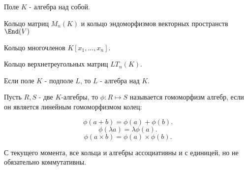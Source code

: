 \begin{example} \thmslashn

    Поле $K$ - алгебра над собой.

    Кольцо матриц $M_{n}(K)$ и кольцо эндоморфизмов векторных пространств $\End(V)$

    Кольцо многочленов $K[x_1, \ldots, x_{n}]$.

    Кольцо верхнетреугольных матриц $LT_{n}(K)$.

    Если поле $K$ - подполе $L$, то $L$ - алгебра над $K$.
\end{example}
\begin{definition} \thmslashn 

    Пусть $R, S$ - две $K$-алгебры, то $\phi : R \mapsto S$ называется гомоморфизм алгебр, если он является линейным гомоморфизмом колец:

    \[ \phi(a + b) = \phi(a) + \phi(b) .\]
    \[ \phi(\lambda a) = \lambda \phi(a) .\]
    \[ \phi(a \times b) = \phi(a) \times \phi(b) .\] 
\end{definition}

С текущего момента, все кольца и алгебры ассоциативны и с единицей, но не обязательно коммутативны.

